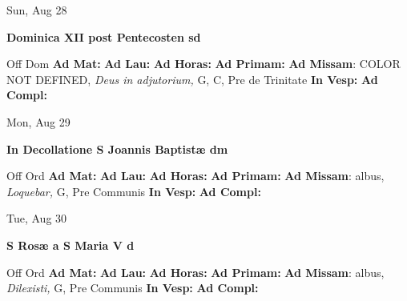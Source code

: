 \documentclass[10pt]{memoir}
\begin{document}
\begin{center}
\begin{minipage}{3.5in}
\vspace{2em}
\begin{center}Sun, Aug 28
\end{center}
\textbf{ \large Dominica XII post Pentecosten
\textnormal{\normalsize sd}}

\begin{justify}Off Dom
\textbf{Ad Mat: }
\textbf{Ad Lau: }
\textbf{Ad Horas: }
\textbf{Ad Primam: }\textbf{Ad Missam}: COLOR NOT DEFINED, \textit{Deus in adjutorium,} G, C, Pre de Trinitate
\textbf{In Vesp: }
\textbf{Ad Compl: }
\end{justify}
\end{minipage}
\end{center}

\begin{center}
\begin{minipage}{3.5in}
\vspace{2em}
\begin{center}Mon, Aug 29
\end{center}
\textbf{ \large In Decollatione S Joannis Baptistæ
\textnormal{\normalsize dm}}

\begin{justify}Off Ord
\textbf{Ad Mat: }
\textbf{Ad Lau: }
\textbf{Ad Horas: }
\textbf{Ad Primam: }\textbf{Ad Missam}: albus, \textit{Loquebar,} G, Pre Communis
\textbf{In Vesp: }
\textbf{Ad Compl: }
\end{justify}
\end{minipage}
\end{center}

\begin{center}
\begin{minipage}{3.5in}
\vspace{2em}
\begin{center}Tue, Aug 30
\end{center}
\textbf{ \large S Rosæ a S Maria V
\textnormal{\normalsize d}}

\begin{justify}Off Ord
\textbf{Ad Mat: }
\textbf{Ad Lau: }
\textbf{Ad Horas: }
\textbf{Ad Primam: }\textbf{Ad Missam}: albus, \textit{Dilexisti,} G, Pre Communis
\textbf{In Vesp: }
\textbf{Ad Compl: }
\end{justify}
\end{minipage}
\end{center}
\end{document}
